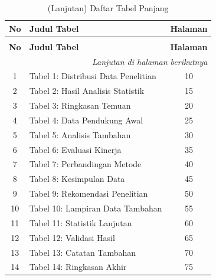 \begin{longtable}{c p{8cm} c}
	\caption{Daftar Tabel Panjang} \label{tab:daftar_tabel_panjang} \\
	\toprule
	\textbf{No} & \textbf{Judul Tabel} & \textbf{Halaman} \\
	\midrule
	\endfirsthead %
	
	\caption[]{(Lanjutan) Daftar Tabel Panjang} \\
	\toprule
	\textbf{No} & \textbf{Judul Tabel} & \textbf{Halaman} \\
	\midrule
	\endhead %
	
	\midrule
	\multicolumn{3}{r}{\textit{Lanjutan di halaman berikutnya}} \\
	\endfoot %
	
	\bottomrule
	\endlastfoot %

		1 & Tabel 1: Distribusi Data Penelitian & 10 \\
	2 & Tabel 2: Hasil Analisis Statistik & 15 \\
	3 & Tabel 3: Ringkasan Temuan & 20 \\
	4 & Tabel 4: Data Pendukung Awal & 25 \\
	5 & Tabel 5: Analisis Tambahan & 30 \\
	6 & Tabel 6: Evaluasi Kinerja & 35 \\
	7 & Tabel 7: Perbandingan Metode & 40 \\
	8 & Tabel 8: Kesimpulan Data & 45 \\
	9 & Tabel 9: Rekomendasi Penelitian & 50 \\
	10 & Tabel 10: Lampiran Data Tambahan & 55 \\
	11 & Tabel 11: Statistik Lanjutan & 60 \\
	12 & Tabel 12: Validasi Hasil & 65 \\
	13 & Tabel 13: Catatan Tambahan & 70 \\
	14 & Tabel 14: Ringkasan Akhir & 75 \\
	

\end{longtable}
